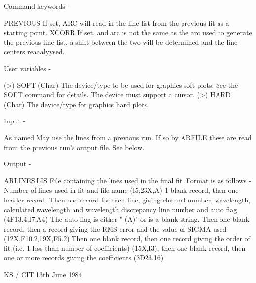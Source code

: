 \begin{description}
\begin{terminalv}
 Command keywords -

 PREVIOUS   If set, ARC will read in the line list from
            the previous fit as a starting point.
 XCORR      If set, and arc is not the same as the arc used
            to generate the previous line list, a shift between the
            two will be determined and the line centers reanalyysed.

 User variables -

 (>) SOFT   (Char) The device/type to be used for graphics
            soft plots.  See the SOFT command for details.
            The device must support a cursor.
 (>) HARD   (Char) The device/type for graphics hard plots.

 Input -

 As named    May use the lines from a previous run.  If so
 by ARFILE   these are read from the previous run's output
             file.  See below.

 Output -

 ARLINES.LIS File containing the lines used in the final fit.
             Format is as follows -
             Number of lines used in fit and file name (I5,23X,A)
             1 blank record, then one header record.
             Then one record for each line, giving channel number,
             wavelength, calculated wavelength and wavelength
             discrepancy line number and auto flag (4F13.4,I7,A4)
             The auto flag is either " (A)" or is a blank string.
             Then one blank record, then a record giving the RMS
             error and the value of SIGMA used (12X,F10.2,19X,F5.2)
             Then one blank record, then one record giving the
             order of fit (i.e. 1 less than number of coefficients)
             (15X,I3), then one blank record, then one or more
             records giving the coefficients (3D23.16)

                                       KS / CIT  13th June 1984
\end{terminalv}
\end{description}

